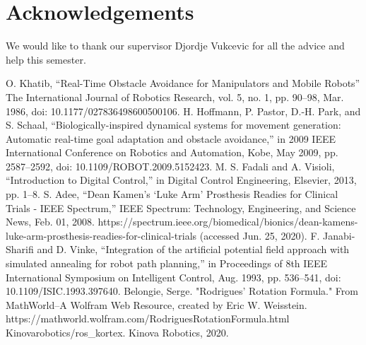 \documentclass[a4paper, 10pt, conference]{ieeeconf}      %
\begin{document}






\section*{Acknowledgements}
We would like to thank our supervisor Djordje Vukcevic for all the advice and help this semester.



\begin{thebibliography}{10}
	
 O. Khatib, “Real-Time Obstacle Avoidance for Manipulators and Mobile Robots” The International Journal of Robotics Research, vol. 5, no. 1, pp. 90–98, Mar. 1986, doi: 10.1177/027836498600500106.
 H. Hoffmann, P. Pastor, D.-H. Park, and S. Schaal, “Biologically-inspired dynamical systems for movement generation: Automatic real-time goal adaptation and obstacle avoidance,” in 2009 IEEE International Conference on Robotics and Automation, Kobe, May 2009, pp. 2587–2592, doi: 10.1109/ROBOT.2009.5152423.
 M. S. Fadali and A. Visioli, “Introduction to Digital Control,” in Digital Control Engineering, Elsevier, 2013, pp. 1–8.
 S. Adee, “Dean Kamen’s ‘Luke Arm’ Prosthesis Readies for Clinical Trials - IEEE Spectrum,” IEEE Spectrum: Technology, Engineering, and Science News, Feb. 01, 2008. https://spectrum.ieee.org/biomedical/bionics/dean-kamens-luke-arm-prosthesis-readies-for-clinical-trials (accessed Jun. 25, 2020).
 F. Janabi-Sharifi and D. Vinke, “Integration of the artificial potential field approach with simulated annealing for robot path planning,” in Proceedings of 8th IEEE International Symposium on Intelligent Control, Aug. 1993, pp. 536–541, doi: 10.1109/ISIC.1993.397640.
  Belongie, Serge. "Rodrigues' Rotation Formula." From MathWorld--A Wolfram Web Resource, created by Eric W. Weisstein. https://mathworld.wolfram.com/RodriguesRotationFormula.html 
 Kinovarobotics/ros\_kortex. Kinova Robotics, 2020.




\end{thebibliography}
\end{document}

